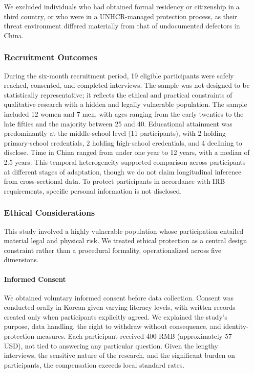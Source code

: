 \documentclass[conference,compsoc]{IEEEtran}
\begin{document}
We excluded individuals who had obtained formal residency or citizenship in a third country, or who were in a UNHCR-managed protection process, as their threat environment differed materially from that of undocumented defectors in China.

\subsubsection{Recruitment Outcomes}

During the six-month recruitment period, 19 eligible participants were safely reached, consented, and completed interviews. The sample was not designed to be statistically representative; it reflects the ethical and practical constraints of qualitative research with a hidden and legally vulnerable population. The sample included 12 women and 7 men, with ages ranging from the early twenties to the late fifties and the majority between 25 and 40. Educational attainment was predominantly at the middle-school level (11 participants), with 2 holding primary-school credentials, 2 holding high-school credentials, and 4 declining to disclose. Time in China ranged from under one year to 12 years, with a median of 2.5 years. This temporal heterogeneity supported comparison across participants at different stages of adaptation, though we do not claim longitudinal inference from cross-sectional data. To protect participants in accordance with IRB requirements, specific personal information is not disclosed.









\subsubsection{Ethical Considerations}

This study involved a highly vulnerable population whose participation entailed material legal and physical risk. We treated ethical protection as a central design constraint rather than a procedural formality, operationalized across five dimensions.

\paragraph{\textbf{Informed Consent}}
We obtained voluntary informed consent before data collection. Consent was conducted orally in Korean given varying literacy levels, with written records created only when participants explicitly agreed. We explained the study's purpose, data handling, the right to withdraw without consequence, and identity-protection measures. Each participant received 400 RMB (approximately 57 USD), not tied to answering any particular question. Given the lengthy interviews, the sensitive nature of the research, and the significant burden on participants, the compensation exceeds local standard rates.
\end{document}

